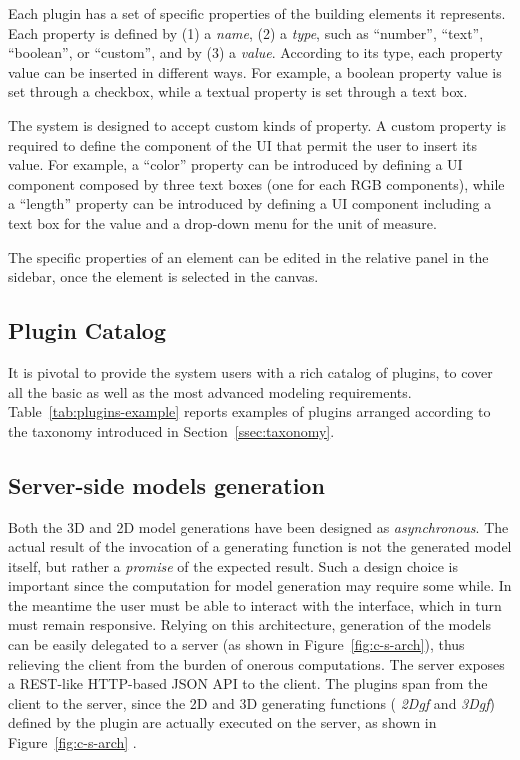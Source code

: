 \documentclass[a4paper,twoside]{article}
\begin{document}
\noindent
Each plugin has a set of specific properties of the building elements it represents.
Each property is defined by (1) a \emph{name}, (2) a \emph{type}, such as ``number'', ``text'', ``boolean'', or ``custom'', and by  (3) a \emph{value}.
According to its type, each property value can be inserted in different ways.
For example, a boolean property value is set through a checkbox, while a textual property is set through a text box.

The system is designed to accept custom kinds of property. A custom property is required to define the component of the UI that permit the user to insert its value.
For example, a ``color'' property can be introduced by defining a UI component composed by three text boxes (one for each RGB components), while a ``length'' property can be introduced by defining a UI component including a text box for the value and a drop-down menu for the unit of measure.

The specific properties of an element can be edited in the relative panel in the sidebar, once the element is selected in the canvas.

\subsection{Plugin Catalog}

\noindent
It is pivotal to provide the system users with a rich catalog of plugins, to cover all the basic as well as the most advanced modeling requirements. Table~\ref{tab:plugins-example} reports examples of plugins arranged according to the  taxonomy introduced in Section~\ref{ssec:taxonomy}.

\subsection{Server-side models generation}

\noindent
Both the 3D and 2D model generations have been designed as \emph{asynchronous}. The actual result of the invocation of a generating function is not the generated model itself, but rather a \emph{promise} of the expected result. Such a design choice is important since the computation for model generation may require some while. In the meantime the user must be able to interact with the interface, which in turn must remain responsive. Relying on this architecture, generation of the models can be easily delegated to a server (as shown in Figure~\ref{fig:c-s-arch}), thus relieving the client from the burden of onerous computations. The server exposes a REST-like HTTP-based JSON API to the client. The plugins span from the client to the server, since the 2D and 3D generating functions ( \emph{2Dgf} and \emph{3Dgf}) defined by the plugin are actually executed on the server, as shown in Figure~\ref{fig:c-s-arch} .
\end{document}
